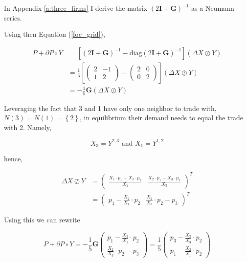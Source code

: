 \documentclass[american]{scrartcl}
\newcommand{\matr}[1]{\bm{#1}}
\newcommand{\set}[1]{\left\{#1\right\}}
\newcommand{\diag}{\text{diag}}
\begin{document}
In Appendix \ref{a:three_firms} I derive the matrix $(2 \matr{I} + \matr{G})^{-1}$ as a Neumann series.

Using then Equation (\ref{foc_grid}),

\begin{equation}
	\begin{split}
		P + \partial P \circ Y &= \left[ (2 \matr{I} + \matr{G})^{-1} - \diag(2 \matr{I} + \matr{G})^{-1}  \right] (\Delta X \oslash Y) \\
		&= \frac{1}{5} \left[ \begin{pmatrix}
				2 & - 1 \\
				1 & 2
			\end{pmatrix} -  \begin{pmatrix}
				2 & 0 \\
				0 & 2
			\end{pmatrix}\right] (\Delta X \oslash Y) \\
		&= -\frac{1}{5} \matr{G} (\Delta X \oslash Y)
	\end{split}
\end{equation}

Leveraging the fact that 3 and 1 have only one neighbor to trade with, $N(3) = N(1) = \set{2}$, in equilibrium their demand needs to equal the trade with 2. Namely,

\begin{equation}
	X_3 = Y^{2, 3} \text{ and } X_1 = Y^{1, 2}
\end{equation}

hence,

\begin{equation}
	\begin{split}
		\Delta X \oslash Y &= \begin{pmatrix}
			\frac{X_1 \cdot p_1 - X_2 \cdot p_2}{X_1} &
			\frac{X_2 \cdot p_1 - X_3 \cdot p_2}{X_3}
		\end{pmatrix}^{T} \\
		&= \begin{pmatrix}
			p_1 - \frac{X_2}{X_1} \cdot p_2 &
			\frac{X_2}{X_3} \cdot p_2 - p_3
		\end{pmatrix}^{T}
	\end{split}
\end{equation}

Using this we can rewrite

\begin{equation}
	P + \partial P \circ Y = - \frac{1}{5} \matr{G} \begin{pmatrix}
		p_1 - \frac{X_2}{X_1} \cdot p_2 \\
		\frac{X_2}{X_3} \cdot p_2 - p_3
	\end{pmatrix} = \frac{1}{5} \begin{pmatrix}
		p_3 - \frac{X_2}{X_3} \cdot p_2 \\
		p_1 - \frac{X_2}{X_1} \cdot p_2
	\end{pmatrix}
\end{equation}
\end{document}
